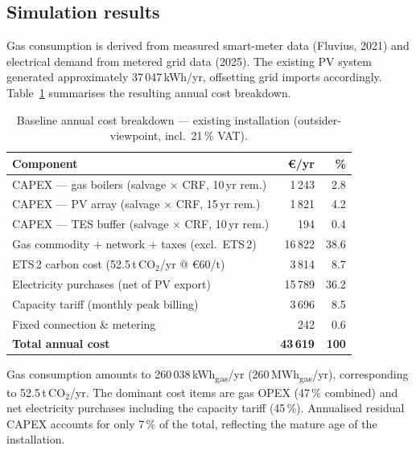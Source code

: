\documentclass[11pt,a4paper]{report}
\begin{document}
\subsection*{Simulation results}

Gas consumption is derived from measured smart-meter data (Fluvius, 2021) and
electrical demand from metered grid data (2025).
The existing PV system generated approximately 37\,047\,kWh/yr, offsetting grid
imports accordingly.
Table~\ref{tab:baseline_cost} summarises the resulting annual cost breakdown.

\begin{table}[htbp]
  \centering
  \caption{Baseline annual cost breakdown --- existing installation
           (outsider-viewpoint, incl.\ 21\,\% VAT).}
  \label{tab:baseline_cost}
  \begin{tabular}{lrr}
    \hline
    \textbf{Component} & \textbf{\euro{}/yr} & \textbf{\%} \\
    \hline
    CAPEX --- gas boilers (salvage $\times$ CRF, 10\,yr rem.) &  1\,243 &  2.8 \\
    CAPEX --- PV array    (salvage $\times$ CRF, 15\,yr rem.) &  1\,821 &  4.2 \\
    CAPEX --- TES buffer  (salvage $\times$ CRF, 10\,yr rem.) &    194  &  0.4 \\
    \hline
    Gas commodity + network + taxes (excl.\ ETS\,2)           & 16\,822 & 38.6 \\
    ETS\,2 carbon cost (52.5\,t\,CO$_2$/yr @ \euro{}60/t)     &  3\,814 &  8.7 \\
    \hline
    Electricity purchases (net of PV export)                  & 15\,789 & 36.2 \\
    Capacity tariff (monthly peak billing)                    &  3\,696 &  8.5 \\
    Fixed connection \& metering                              &    242  &  0.6 \\
    \hline
    \textbf{Total annual cost}                                & \textbf{43\,619} & \textbf{100} \\
    \hline
  \end{tabular}
\end{table}

Gas consumption amounts to 260\,038\,kWh\textsubscript{gas}/yr
(260\,MWh\textsubscript{gas}/yr), corresponding to 52.5\,t\,CO$_2$/yr.
The dominant cost items are gas OPEX (47\,\% combined) and net electricity
purchases including the capacity tariff (45\,\%).
Annualised residual CAPEX accounts for only 7\,\% of the total, reflecting the
mature age of the installation.
\end{document}
